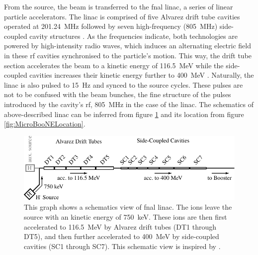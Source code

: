 From the  source, the beam is transferred to the \gls{fnal} \gls{linac}, a series of linear particle accelerators. The \gls{linac} is comprised of five Alvarez drift tube cavities operated at \SI{201.24}{\mega\hertz} \cite{BNBLinac1} followed by seven high-frequency (\SI{805}{\mega\hertz}) side-coupled cavity structures \cite{BNBLinac2}. As the frequencies indicate, both technologies are powered by high-intensity radio waves, which induces an alternating electric field in these \gls{rf} cavities synchronised to the particle's motion. This way, the drift tube section accelerates the  beam to a kinetic energy of \SI{116.5}{\mega\electronvolt} while the side-coupled cavities increases their kinetic energy further to \SI{400}{\mega\electronvolt} \cite{BNBLinac3}. Naturally, the \gls{linac} is also pulsed to \SI{15}{\hertz} and synced to the  source cycles. These pulses are not to be confused with the beam bunches, \ie the fine structure of the pulses introduced by the cavity's \gls{rf}, \SI{805}{\mega\hertz} in the case of the \gls{linac}. The schematics of above-described \gls{linac} can be inferred from figure \ref{fig:Linac} and its location from figure \ref{fig:MicroBooNELocation}.
\begin{figure}[htbp]
    \centering
    \includegraphics[width=1.0\textwidth]{images/MicroBooNE/LinacSchematics.pdf}
    \caption[Schematics View of the Linac]{This graph shows a schematics view of \gls{fnal} \gls{linac}. The  ions leave the source with an kinetic energy of \SI{750}{\kilo\electronvolt}. These ions are then first accelerated to \SI{116.5}{\mega\electronvolt} by Alvarez drift tubes (DT1 through DT5), and then further accelerated to \SI{400}{\mega\electronvolt} by side-coupled cavities (SC1 through SC7). This schematic view is inspired by \cite{BNBLinac3}.}
    \label{fig:Linac}
\end{figure}

